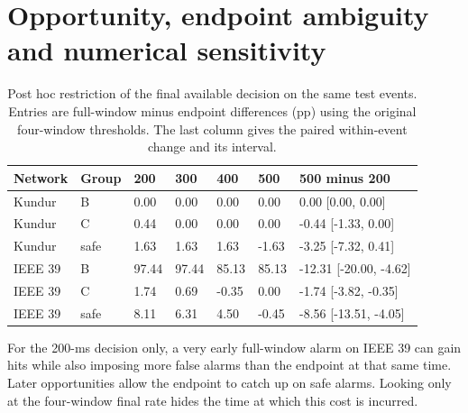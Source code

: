 \documentclass[10pt]{article}
\begin{document}
\section{Opportunity, endpoint ambiguity and numerical sensitivity}
\begin{table}[htbp]\centering\small
\caption{Post hoc restriction of the final available decision on the same test events. Entries are full-window minus endpoint differences (pp) using the original four-window thresholds. The last column gives the paired within-event change and its interval.}\label{tab:horizons}
\begin{tabular}{@{}lllllll@{}}\toprule
Network & Group & 200 & 300 & 400 & 500 & 500 minus 200 \\\midrule
Kundur & B & 0.00 & 0.00 & 0.00 & 0.00 & 0.00 [0.00, 0.00] \\
Kundur & C & 0.44 & 0.00 & 0.00 & 0.00 & -0.44 [-1.33, 0.00] \\
Kundur & safe & 1.63 & 1.63 & 1.63 & -1.63 & -3.25 [-7.32, 0.41] \\
IEEE 39 & B & 97.44 & 97.44 & 85.13 & 85.13 & -12.31 [-20.00, -4.62] \\
IEEE 39 & C & 1.74 & 0.69 & -0.35 & 0.00 & -1.74 [-3.82, -0.35] \\
IEEE 39 & safe & 8.11 & 6.31 & 4.50 & -0.45 & -8.56 [-13.51, -4.05] \\
\bottomrule\end{tabular}\end{table}
For the 200-ms decision only, a very early full-window alarm on IEEE 39 can gain hits while also imposing more false alarms than the endpoint at that same time. Later opportunities allow the endpoint to catch up on safe alarms. Looking only at the four-window final rate hides the time at which this cost is incurred.
\end{document}
